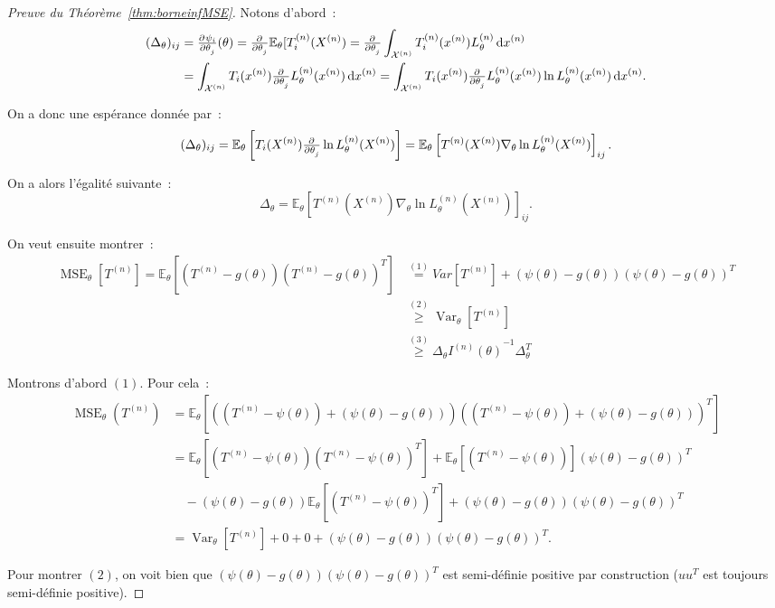 \documentclass{report}
\DeclareMathOperator{\Var}{Var}
\DeclareMathOperator{\MSE}{MSE}
\newcommand{\E}{\mathbb E}
\newcommand{\n}{{(n)}}
\newcommand{\Xn}{{X^\n}}
\newcommand{\Tn}{{T^\n}}
\newcommand{\TnXn}{{\Tn(\Xn)}}
\theoremstyle{definition}
\theoremstyle{remark}
\begin{document}
			\begin{proof}[Preuve du Théorème~\ref{thm:borneinfMSE}] Notons d'abord~:
			\begin{align*} (\Delta_\theta)_{ij} &= \pd {\psi_i}{\theta_j}(\theta) = \pd {}{\theta_j}\E_\theta[T_i^{(n)}(\Xn)
				= \pd {}{\theta_j}\int_{\mathcal X^{(n)}}T_i^{(n)}(x^{(n)})L_\theta^{(n)}\dif x^{(n)} \\
			&= \int_{\mathcal X^{(n)}}T_i(x^{(n)})\pd {}{\theta_j}L_\theta^{(n)}(x^{(n)})\dif x^{(n)}
				= \int_{\mathcal X^{(n)}}T_i(x^{(n)})\pd {}{\theta_j}L_\theta^{(n)}(x^{(n)})\ln L_\theta^{(n)}(x^{(n)})\dif x^{(n)}.
			\end{align*}

			On a donc une espérance donnée par~:
			\[(\Delta_\theta)_{ij} = \E_\theta\left[T_i(X^{(n)})\pd {}{\theta_j}\ln L_\theta^{(n)}(X^{(n)})\right]
				= \E_\theta\left[\TnXn\nabla_\theta\ln L_\theta^{(n)}(X^{(n)})\right]_{ij}.\]

			On a alors l'égalité suivante~:
			\[\Delta_\theta = \E_\theta\left[\TnXn\nabla_\theta\ln L_\theta^{(n)}(X^{(n)})\right]_{ij}.\]

			On veut ensuite montrer~:
			\begin{align*}
				\MSE_\theta[\Tn] = \E_\theta\left[\left(\Tn - g(\theta)\right)\left(\Tn - g(\theta)\right)^T\right] &\overset {(1)}=
					Var[\Tn] + \left(\psi(\theta)-g(\theta)\right)\left(\psi(\theta)-g(\theta)\right)^T \\
				&\overset{(2)}\geq \Var_\theta[\Tn] \\
				&\overset{(3)}\geq \Delta_\theta{I^{(n)}(\theta)}^{-1}\Delta_\theta^T
			\end{align*}

			Montrons d'abord $(1)$. Pour cela~:
			\begin{align*}
				\MSE_\theta(\Tn) &= \E_\theta\left[\left((\Tn - \psi(\theta)) + (\psi(\theta) - g(\theta))\right)\left((\Tn - \psi(\theta)) + (\psi(\theta) - g(\theta))\right)^T\right] \\
				&=\E_\theta[(\Tn - \psi(\theta))(\Tn - \psi(\theta))^T] + \E_\theta[(\Tn - \psi(\theta))](\psi(\theta) - g(\theta))^T \\
				&\quad- (\psi(\theta) - g(\theta))\E_\theta[(\Tn - \psi(\theta))^T] + (\psi(\theta) - g(\theta))(\psi(\theta) - g(\theta))^T \\
				&= \Var_\theta[\Tn] + 0 + 0 + (\psi(\theta) - g(\theta))(\psi(\theta) - g(\theta))^T.
			\end{align*}

			Pour montrer $(2)$, on voit bien que $(\psi(\theta) - g(\theta))(\psi(\theta) - g(\theta))^T$ est semi-définie positive par construction ($uu^T$ est toujours
			semi-définie positive).


\end{proof}
\end{document}
